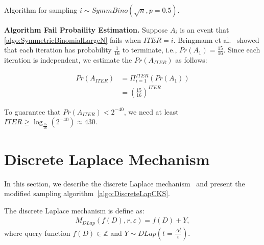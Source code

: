 \begin{algorithm}[tbh!]
{{                \\
                \\
                \\
                \\
                \\
            }}
        \caption{Algorithm for sampling $i\sim SymmBino\left(\sqrt{n} ,p=0.5\right) $.}
        \label{algo:SymmetricBinomialLargeN}
    \end{algorithm}
    \FloatBarrier

    \textbf{Algorithm Fail Probaility Estimation. }
    Suppose $A_i$ is an event that \autoref{algo:SymmetricBinomialLargeN} fails when $ITER=i$.
    Bringmann et al.~\cite{Bringmann2014InternalDE} showed that each iteration has probability $\frac{1}{16} $ to terminate, i.e., $Pr\left(A_1\right)=\frac{15}{16} $.
    Since each iteration is independent, we estimate the $Pr\left(A_{ITER}\right)$ as follows:

    \begin{equation}
        \begin{split}
            Pr\left(A_{ITER}\right) &  =  \Pi _{i=1}^{ITER}\left(Pr\left(A_1\right) \right) \\
            &=\left(\frac{15}{16}\right)^{ITER}
        \end{split}
    \end{equation}

    To guarantee that $Pr\left(A_{ITER}\right)<2^{-40}$, we need at least $ITER\geq \log _\frac{15}{16}\left(2^{-40}\right)\approx 430$.

    \section{Discrete Laplace Mechanism}
    \label{sec:discreteLaplacemechanism}

    In this section, we describe the discrete Laplace mechanism~\cite{chan2012privacy, ghosh2012universally,eigner2014differentially,canonne2020discrete} and present the modified sampling algorithm~\autoref{algo:DiscreteLapCKS}.

    The discrete Laplace mechanism is define as:
    \begin{equation}
        \begin{split}
            M_{DLap}\left(f\left(D\right),r,\varepsilon\right)=f\left(D\right) +Y,
        \end{split}
    \end{equation}
    where query function $f\left(D\right)\in\mathbb{Z} $ and $Y\sim DLap\left(t=\frac{\Delta_1^{f}}{\varepsilon}\right) $.

